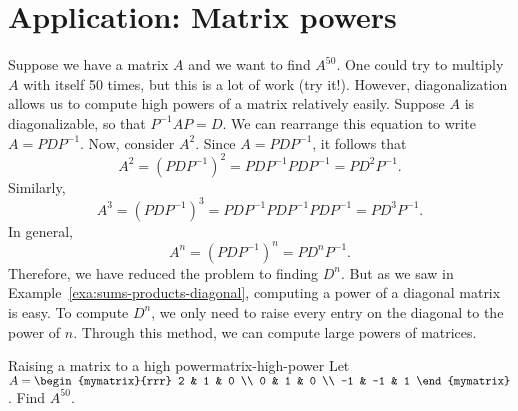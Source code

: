 \section{Application: Matrix powers}

Suppose we have a matrix $A$ and we want to find $A^{50}$. One could
try to multiply $A$ with itself 50 times, but this is a lot of work
(try it!). However, diagonalization allows us to compute high powers
of a matrix relatively easily.  Suppose $A$ is diagonalizable, so that
$P^{-1}AP=D$. We can rearrange this equation to write $A=PDP^{-1}$.
Now, consider $A^{2}$. Since $A=PDP^{-1}$, it follows that
\begin{equation*}
  A^{2} = (PDP^{-1}) ^{2}=PDP^{-1}PDP^{-1}=PD^{2}P^{-1}.
\end{equation*}
Similarly, 
\begin{equation*}
  A^3 = (PDP^{-1}) ^{3}=PDP^{-1}PDP^{-1}PDP^{-1}=PD^{3}P^{-1}.
\end{equation*}
In general,
\begin{equation*}
  A^n = (PDP^{-1}) ^{n}=PD^{n}P^{-1}.
\end{equation*}
Therefore, we have reduced the problem to finding $D^{n}$. But as we
saw in Example~\ref{exa:sums-products-diagonal}, computing a power of
a diagonal matrix is easy. To compute $D^{n}$, we only need to raise
every entry on the diagonal to the power of $n$. Through this method,
we can compute large powers of matrices.

\begin{example}{Raising a matrix to a high power}{matrix-high-power}
  Let%
  $A=\begin{mymatrix}{rrr}
    2 & 1 & 0 \\
    0 & 1 & 0 \\
    -1 & -1 & 1
  \end{mymatrix}$. Find $A^{50}$.
\end{example}

